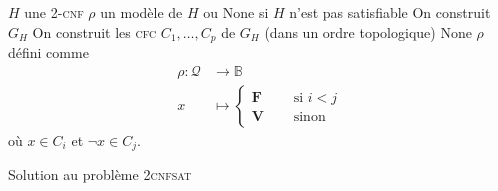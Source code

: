 \begin{prvk}
	\begin{algorithm}[H]
		\centering
		\begin{algorithmic}[1]
			\Entree $H$\/ une 2-\textsc{cnf}
			\Sortie $\rho$\/ un modèle de $H$\/ ou $\mathrm{None}$\/ si $H$\/ n'est pas satisfiable
			\State On construit $G_H$\/ 
			\State On construit les \textsc{cfc} $C_1,\ldots,C_p$\/ de $G_H$\/ (dans un ordre topologique)
				\State \Return $\mathrm{None}$\/
			\Else
				\State\Return $\rho$\/ défini comme \begin{align*}
					\rho: \mathcal{Q} &\longrightarrow \mathds{B} \\
					x &\longmapsto \begin{cases}
						\mathbf{F} & \quad \text{ si } i < j\\
						\mathbf{V}&\quad \text{ sinon}
					\end{cases}
				\end{align*}
				où $x \in C_i$\/ et $\lnot x \in C_j$.
			\EndIf
		\end{algorithmic}
		\caption{Solution au problème \textsc{2cnfsat}}
	\end{algorithm}

\end{prvk}

